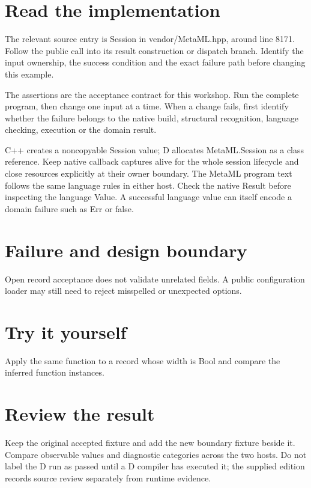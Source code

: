 \section*{Read the implementation}
The relevant source entry is Session in vendor/MetaML.hpp, around line 8171. Follow the public call into its result construction or dispatch branch. Identify the input ownership, the success condition and the exact failure path before changing this example.

The assertions are the acceptance contract for this workshop. Run the complete program, then change one input at a time. When a change fails, first identify whether the failure belongs to the native build, structural recognition, language checking, execution or the domain result.

\clearpage
{}
C++ creates a noncopyable Session value; D allocates MetaML.Session as a class reference. Keep native callback captures alive for the whole session lifecycle and close resources explicitly at their owner boundary. The MetaML program text follows the same language rules in either host. Check the native Result before inspecting the language Value. A successful language value can itself encode a domain failure such as Err or false.


\section*{Failure and design boundary}
Open record acceptance does not validate unrelated fields. A public configuration loader may still need to reject misspelled or unexpected options.

\section*{Try it yourself}
Apply the same function to a record whose width is Bool and compare the inferred function instances.

\section*{Review the result}
Keep the original accepted fixture and add the new boundary fixture beside it. Compare observable values and diagnostic categories across the two hosts. Do not label the D run as passed until a D compiler has executed it; the supplied edition records source review separately from runtime evidence.

